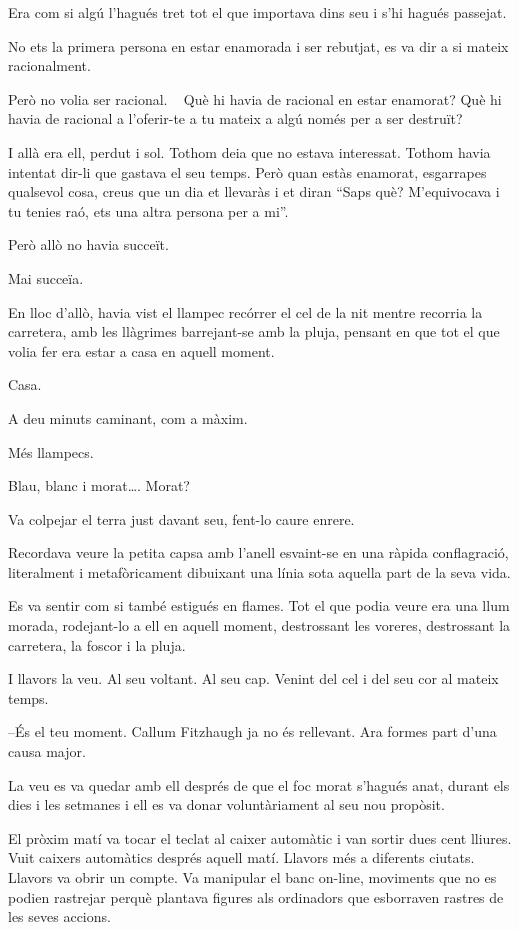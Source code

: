 Era com si algú l'hagués tret tot el que importava dins seu i s'hi
hagués passejat.

No ets la primera persona en estar enamorada i ser rebutjat, es va dir a
si mateix racionalment.

Però no volia ser racional. ~ Què hi havia de racional en estar
enamorat? Què hi havia de racional a l'oferir-te a tu mateix a algú
només per a ser destruït?

I allà era ell, perdut i sol. Tothom deia que no estava interessat.
Tothom havia intentat dir-li que gastava el seu temps. Però quan estàs
enamorat, esgarrapes qualsevol cosa, creus que un dia et llevaràs i et
diran ``Saps què? M'equivocava i tu tenies raó, ets una altra persona
per a mi''.

Però allò no havia succeït.

Mai succeïa.

En lloc d'allò, havia vist el llampec recórrer el cel de la nit mentre
recorria la carretera, amb les llàgrimes barrejant-se amb la pluja,
pensant en que tot el que volia fer era estar a casa en aquell moment.

Casa.

A deu minuts caminant, com a màxim.

Més llampecs.

Blau, blanc i morat\ldots{}. Morat?

Va colpejar el terra just davant seu, fent-lo caure enrere.

Recordava veure la petita capsa amb l'anell esvaint-se en una ràpida
conflagració, literalment i metafòricament dibuixant una línia sota
aquella part de la seva vida.

Es va sentir com si també estigués en flames. Tot el que podia veure era
una llum morada, rodejant-lo a ell en aquell moment, destrossant les
voreres, destrossant la carretera, la foscor i la pluja.

I llavors la veu. Al seu voltant. Al seu cap. Venint del cel i del seu
cor al mateix temps.

--És el teu moment. Callum Fitzhaugh ja no és rellevant. Ara formes part
d'una causa major.

La veu es va quedar amb ell després de que el foc morat s'hagués anat,
durant els dies i les setmanes i ell es va donar voluntàriament al seu
nou propòsit.

El pròxim matí va tocar el teclat al caixer automàtic i van sortir dues
cent lliures. Vuit caixers automàtics després aquell matí. Llavors més a
diferents ciutats. Llavors va obrir un compte. Va manipular el banc
on-line, moviments que no es podien rastrejar perquè plantava figures
als ordinadors que esborraven rastres de les seves accions.

